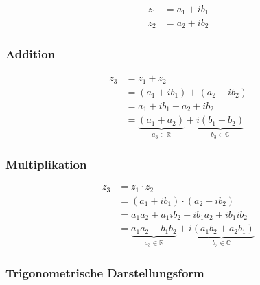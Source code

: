 \begin{align*}
	z_1 &= a_1 + i b_1 \\
	z_2 &= a_2 + i b_2
\end{align*}


\subsubsection{Addition}


\begin{align*}
	z_3 &= z_1 + z_2 \\
	&= (a_1 + i b_1) + (a_2 + i b_2) \\
	&= a_1 + i b_1 + a_2 + i b_2 \\
	&= \underbrace{(a_1 + a_2)}_{a_3 \in \mathbb{R}} +
	\underbrace{i(b_1 + b_2)}_{b_3 \in \mathbb{C}}
\end{align*}

\subsubsection{Multiplikation}

\begin{align*}
	z_3 &= z_1 \cdot z_2 \\
	&= (a_1 + i b_1) \cdot (a_2 + i b_2) \\
	&= a_1 a_2 + a_1 ib_2 + ib_1 a_2 + ib_1 ib_2 \\
	&= \underbrace{a_1 a_2 - b_1 b_2}_{a_3 \in \mathbb{R}} +
	\underbrace{i(a_1 b_2 + a_2 b_1)}_{b_3 \in \mathbb{C}}
\end{align*}


\subsubsection{Trigonometrische Darstellungsform}

